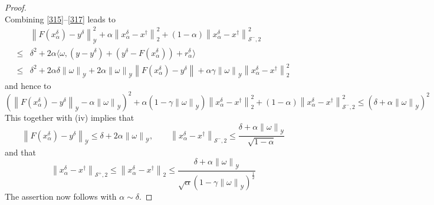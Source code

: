 \documentclass[11pt]{article}
\begin{document}
\begin{proof}
\begin{equation}
\end{equation}
Combining \eqref{315}--\eqref{317} leads to
\begin{displaymath}
\begin{aligned}
&\left\|F(x_{\alpha}^{\delta}) - y^\delta\right\|^2_\mathcal{Y} + \alpha\left\|x_{\alpha}^{\delta} - x^\dagger\right\|_2^2 + (1-\alpha)\left\|x_{\alpha}^{\delta} - x^\dagger\right\|_{\mathcal{S}^-, 2}^2\\
\leq 
&\delta^2 + 2\alpha\langle \omega, (y - y^\delta) + (y^\delta - F(x^\delta_\alpha)) + r^\delta_\alpha\rangle\\
\leq
&\delta^2 + 2\alpha\delta\left\|\omega\right\|_\mathcal{Y} + 2\alpha\left\|\omega\right\|_\mathcal{Y}\left\|F(x^\delta_\alpha) - y^\delta\right\| + \alpha\gamma\left\|\omega\right\|_\mathcal{Y}\left\|x^\delta_\alpha - x^\dagger\right\|^2_2
\end{aligned}
\end{displaymath}
and hence to
\begin{displaymath}
\left(\left\|F(x^\delta_\alpha) - y^\delta\right\|_\mathcal{Y} - \alpha\left\|\omega\right\|_\mathcal{Y}\right)^2 + \alpha(1 - \gamma\left\|\omega\right\|_\mathcal{Y})\left\|x^\delta_\alpha - x^\dagger\right\|^2_2 + (1-\alpha)\left\|x_{\alpha}^{\delta} - x^\dagger\right\|_{\mathcal{S}^-, 2}^2\leq (\delta + \alpha\left\|\omega\right\|_\mathcal{Y})^2
\end{displaymath}
This together with (iv) implies that
\begin{displaymath}
\left\|F(x^\delta_\alpha) - y^\delta\right\|_\mathcal{Y} \leq \delta + 2\alpha\left\|\omega\right\|_\mathcal{Y},\qquad \left\|x_{\alpha}^{\delta} - x^\dagger\right\|_{\mathcal{S}^-, 2} \leq \dfrac{\delta + \alpha\left\|\omega\right\|_\mathcal{Y}}{\sqrt{1-\alpha}}
\end{displaymath}
and that
\begin{displaymath}
\left\|x_{\alpha}^{\delta} - x^\dagger\right\|_{\mathcal{S}^+, 2} \leq \left\|x_{\alpha}^{\delta} - x^\dagger\right\|_2\leq \dfrac{\delta + \alpha\left\|\omega\right\|_\mathcal{Y}}{\sqrt{\alpha}\left(1 - \gamma\left\|\omega\right\|_\mathcal{Y}\right)^{\frac{1}{2}}}
\end{displaymath}
The assertion now follows with $ \alpha\sim\delta $.
\end{proof}
\end{document}
